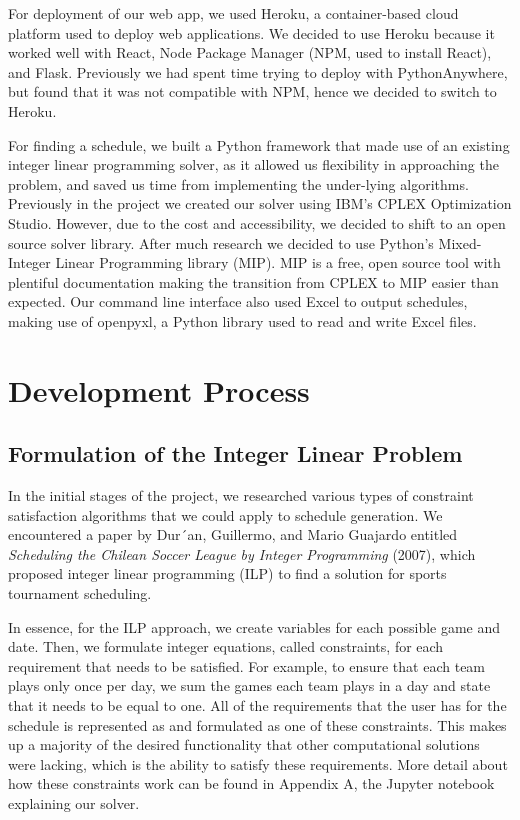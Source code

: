 \documentclass[book]{hmcclinic}
\begin{document}
For deployment of our web app, we used Heroku, a container-based cloud platform used to deploy web applications. We decided to use Heroku because it worked well with React, Node Package Manager (NPM, used to install React), and Flask. Previously we had spent time trying to deploy with PythonAnywhere, but found that it was not compatible with NPM, hence we decided to switch to Heroku. 

For finding a schedule, we built a Python framework that made use of an existing integer linear programming solver, as it allowed us flexibility in approaching the problem, and saved us time from implementing the under-lying algorithms. Previously in the project we created our solver using IBM’s CPLEX Optimization Studio. However, due to the cost and accessibility, we decided to shift to an open source solver library. After much research we decided to use Python's Mixed-Integer Linear Programming library (MIP). MIP is a free, open source tool with plentiful documentation making the transition from CPLEX to MIP easier than expected. Our command line interface also used Excel to output schedules, making use of openpyxl, a Python library used to read and write Excel files.


\chapter{Development Process}

\section{Formulation of the Integer Linear Problem}
In the initial stages of the project, we researched various types of constraint satisfaction algorithms that we could apply to schedule generation. We encountered a paper by Dur´an, Guillermo, and Mario Guajardo entitled \textit{Scheduling the Chilean Soccer League by Integer Programming} (2007), which proposed integer linear programming (ILP) to find a solution for sports tournament scheduling. 

In essence, for the ILP approach, we create variables for each possible game and date. Then, we formulate integer equations, called constraints, for each requirement that needs to be satisfied. For example, to ensure that each team plays only once per day, we sum the games each team plays in a day and state that it needs to be equal to one. All of the requirements that the user has for the schedule is represented as and formulated as one of these constraints. This makes up a majority of the desired functionality that other computational solutions were lacking, which is the ability to satisfy these requirements. More detail about how these constraints work can be found in Appendix A, the Jupyter notebook explaining our solver.
\end{document}
